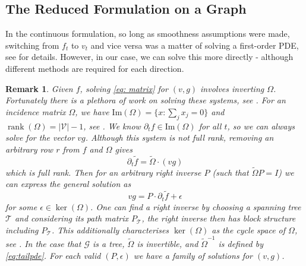 \documentclass[conference]{IEEEtran}
\newcommand{\GG}{\mathcal{G}}
\newcommand{\VV}{\mathcal{V}}
\newcommand{\TT}{\mathcal{T}}
\DeclareMathOperator{\rank}{rank}
\theoremstyle{ieeestyle}
\newtheorem{rmk}{Remark}
\begin{document}
\subsection{The Reduced Formulation on a Graph}
In the continuous formulation, so long as smoothness assumptions were made, switching from $f_t$ to $v_t$ and vice versa was a matter of solving a first-order PDE, see  \cite[Chapter 16.1]{ambrosio2021lectures} for details. However, in our case, we can solve this more directly - although different methods are required for each direction.
\begin{rmk}\label{rmk: sol2}
Given $f$, solving \eqref{eq: matrix} for $(v,g)$ involves inverting $\Omega$. Fortunately there is a plethora of work on solving these systems, see \cite[Section 2]{bapat2010graphs}. For an incidence matrix $\Omega$, we have $\text{Im}(\Omega) = \{ x: \sum_j x_j = 0 \}$ and $\rank (\Omega) = |\VV| -1$, see \cite[Lemma 2.4]{bapat2010graphs}. We know $\partial_t f \in \text{Im} (\Omega)$ for all $t$, so we can always solve for the vector $vg$. Although this system is not full rank, removing an arbitrary row $r$ from $f$ and $\Omega$ gives
\begin{equation*}
    \partial_t \tilde{f} = \tilde{\Omega} \cdot (vg)
\end{equation*}
which is full rank. Then for an arbitrary right inverse $P$ (such that $ \tilde{\Omega}  P= I$) we can express the general solution as
\begin{equation*}
    vg = P \cdot \partial_t \tilde{f} + \epsilon
\end{equation*}
for some $\epsilon \in \ker(\Omega)$. One can find a right inverse by choosing a spanning tree $\TT$ and considering its \textit{path matrix} $P_{\TT}$, the right inverse then has block structure including $P_{\TT}$. This additionally characterises $\ker(\Omega)$ as the cycle space of $\Omega$, see \cite[Theorem 2.13]{bapat2010graphs}. In the case that $\GG$ is a tree, $\tilde{\Omega}$ is invertible, and $\tilde{\Omega}^{-1}$ is defined by \eqref{eq:tailpde}. For each valid $(P,\epsilon)$ we have a family of solutions for $(v,g)$.
\end{rmk} 
\end{document}
